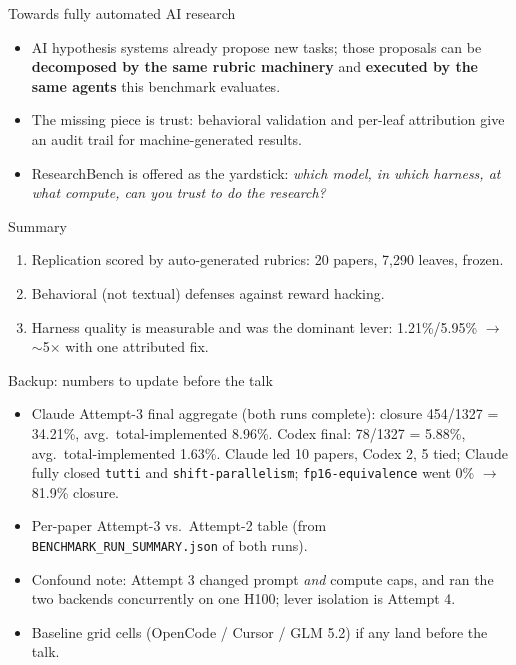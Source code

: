 \documentclass[aspectratio=169]{beamer}
\begin{document}
\begin{frame}{Towards fully automated AI research}
  \begin{itemize}
    \item AI hypothesis systems already propose new tasks; those proposals can be
          \textbf{decomposed by the same rubric machinery} and \textbf{executed by the
          same agents} this benchmark evaluates.
    \item The missing piece is trust: behavioral validation and per-leaf attribution
          give an audit trail for machine-generated results.
    \item ResearchBench is offered as the yardstick: \emph{which model, in which
          harness, at what compute, can you trust to do the research?}
  \end{itemize}
  \vfill
  \begin{block}{Summary}
    \begin{enumerate}
      \item Replication scored by auto-generated rubrics: 20 papers, 7{,}290 leaves, frozen.
      \item Behavioral (not textual) defenses against reward hacking.
      \item Harness quality is measurable and was the dominant lever:
            1.21\%/5.95\% $\rightarrow$ $\sim$5$\times$ with one attributed fix.
    \end{enumerate}
  \end{block}
\end{frame}

\begin{frame}{Backup: numbers to update before the talk}
  \small
  \begin{itemize}
    \item Claude Attempt-3 final aggregate (both runs complete): closure
          454/1327 = 34.21\%, avg.\ total-implemented 8.96\%. Codex final:
          78/1327 = 5.88\%, avg.\ total-implemented 1.63\%. Claude led 10
          papers, Codex 2, 5 tied; Claude fully closed \texttt{tutti} and
          \texttt{shift-parallelism}; \texttt{fp16-equivalence} went
          0\% $\rightarrow$ 81.9\% closure.
    \item Per-paper Attempt-3 vs.\ Attempt-2 table (from
          \texttt{BENCHMARK\_RUN\_SUMMARY.json} of both runs).
    \item Confound note: Attempt 3 changed prompt \emph{and} compute caps, and ran the
          two backends concurrently on one H100; lever isolation is Attempt 4.
    \item Baseline grid cells (OpenCode / Cursor / GLM 5.2) if any land before the talk.
  \end{itemize}
\end{frame}
\end{document}
